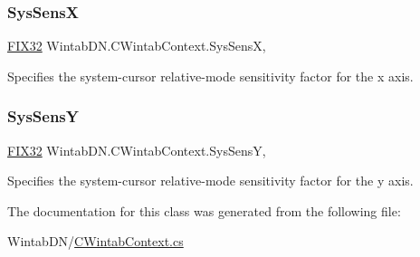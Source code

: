 \subsubsection{\texorpdfstring{Sys\+SensX}{SysSensX}}
{\footnotesize\ttfamily \mbox{\hyperlink{class_wintab_d_n_1_1_f_i_x32}{F\+I\+X32}} Wintab\+D\+N.\+C\+Wintab\+Context.\+Sys\+SensX\hspace{0.3cm}{\ttfamily [get]}, {\ttfamily [set]}}



Specifies the system-\/cursor relative-\/mode sensitivity factor for the x axis. 

\mbox{\label{class_wintab_d_n_1_1_c_wintab_context_ab1c31c691d5659eb3bde3c999b62d5b6}} 
\subsubsection{\texorpdfstring{Sys\+SensY}{SysSensY}}
{\footnotesize\ttfamily \mbox{\hyperlink{class_wintab_d_n_1_1_f_i_x32}{F\+I\+X32}} Wintab\+D\+N.\+C\+Wintab\+Context.\+Sys\+SensY\hspace{0.3cm}{\ttfamily [get]}, {\ttfamily [set]}}



Specifies the system-\/cursor relative-\/mode sensitivity factor for the y axis. 



The documentation for this class was generated from the following file\+:\begin{DoxyCompactItemize}
\item 
Wintab\+D\+N/\mbox{\hyperlink{_c_wintab_context_8cs}{C\+Wintab\+Context.\+cs}}\end{DoxyCompactItemize}
